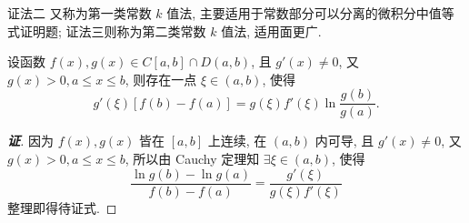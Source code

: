 证法二 又称为第一类常数 $k$ 值法, 主要适用于常数部分可以分离的微积分中值等式证明题; 证法三则称为第二类常数 $k$ 值法, 适用面更广.
\begin{inference}
    设函数 $f(x),g(x)\in C[a,b]\cap D(a,b)$, 且 $g'(x)\neq0$, 又 $g(x)>0,a\leqslant x\leqslant b$, 则存在一点 $\xi\in(a,b)$, 使得\label{gfbfagf}
    $$g'(\xi)  \left[ f(b)  -f(a)  \right] =g(\xi)  f'(\xi)  \ln \dfrac{g(b)  }{g(a)  }.$$
\end{inference}
\begin{proof}[{\songti \textbf{证}}]
    因为 $f(x),g(x)$ 皆在 $[a,b]$ 上连续, 在 $(a,b)$ 内可导, 且 $g'(x)\neq0$, 又 $g(x)>0,a\leqslant x\leqslant b$, 
    所以由 Cauchy 定理知 $\exists\xi\in(a,b)$, 使得
    $$\dfrac{\ln g(b)-\ln g(a)}{f(b)-f(a)}=\dfrac{g'(\xi)}{g(\xi)f'(\xi)}$$
    整理即得待证式.
\end{proof}

